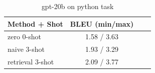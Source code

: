 \begin{table}[ht]
\centering
\small
\caption{gpt-20b on python task}
\begin{tabular}{lccc}
\hline
Method + Shot & BLEU (min/max) \\
\hline
zero 0-shot & 1.58 / 3.63 \\
naive 3-shot & 1.93 / 3.29 \\
retrieval 3-shot & 2.09 / 3.77 \\
\hline
\end{tabular}
\end{table}

